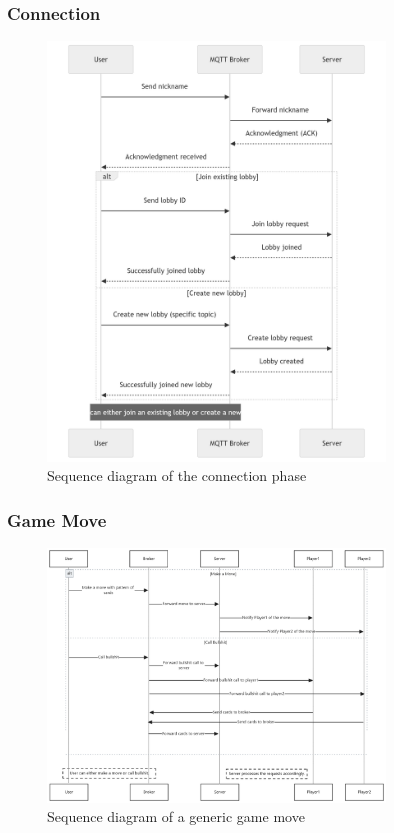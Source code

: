 \documentclass{scrartcl}
\begin{document}
\subsubsection{Connection}\label{connection}
\begin{figure}[H]
  \centering
  \includegraphics[width=0.8\textwidth]{figures/sequenceConnection.png}
  \caption{Sequence diagram of the connection phase} 
  \label{fig:connection}
\end{figure}

\subsubsection{Game Move}\label{game-move}
\begin{figure}[H]
  \centering
  \includegraphics[width=0.8\textwidth]{figures/sequenceGameMove.png}
  \caption{Sequence diagram of a generic game move} 
  \label{fig:gane-move}
\end{figure}
\end{document}
